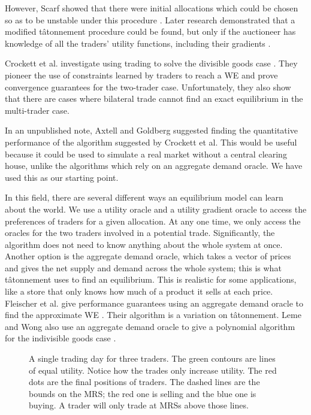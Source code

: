\documentclass[12pt,a4paper,titlepage]{article}
\begin{document}
However, Scarf showed that there were initial allocations which could be chosen so as to be unstable under this procedure \cite{scarf}.
Later research demonstrated that a modified tâtonnement procedure could be found, but only if the auctioneer has knowledge of all the traders' utility functions, including their gradients \cite{smale}.

Crockett et al. investigate using trading to solve the divisible goods case \cite{crockett}.
They pioneer the use of constraints learned by traders to reach a WE and prove convergence guarantees for the two-trader case.
Unfortunately, they also show that there are cases where bilateral trade cannot find an exact equilibrium in the multi-trader case.

In an unpublished note, Axtell and Goldberg \cite{goldberg} suggested finding the quantitative performance of the algorithm suggested by Crockett et al.
This would be useful because it could be used to simulate a real market without a central clearing house, unlike the algorithms which rely on an aggregate demand oracle.
We have used this as our starting point.


In this field, there are several different ways an equilibrium model can learn about the world. 
We use a utility oracle and a utility gradient oracle to access the preferences of traders for a given allocation.
At any one time, we only access the oracles for the two traders involved in a potential trade.
Significantly, the algorithm does not need to know anything about the whole system at once.
Another option is the aggregate demand oracle, which takes a vector of prices and gives the net supply and demand across the whole system; this is what tâtonnement uses to find an equilibrium.
This is realistic for some applications, like a store that only knows how much of a product it sells at each price.
Fleischer et al. give performance guarantees using an aggregate demand oracle to find the approximate WE \cite{fleischer}.
Their algorithm is a variation on tâtonnement.
Leme and Wong also use an aggregate demand oracle to give a polynomial algorithm for the indivisible goods case \cite{leme}.

\begin{figure}[H]
    \hspace{-0.9cm}
    
    \caption{
      A single trading day for three traders.
      The green contours are lines of equal utility.
      Notice how the trades only increase utility.
      The red dots are the final positions of traders.
      The dashed lines are the bounds on the MRS; the red one is selling and the blue one is buying.
      A trader will only trade at MRSs above those lines.
    }
    \label{fig:day}
\end{figure}
\end{document}
